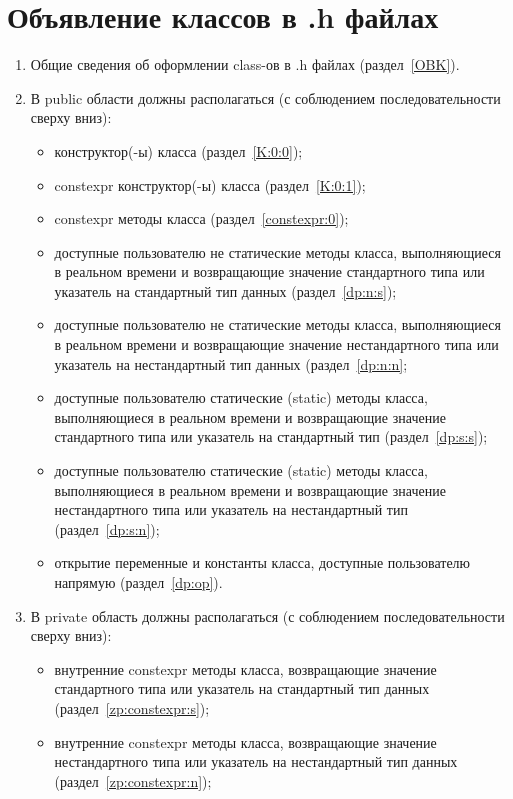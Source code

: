 \chapter{Объявление классов в .h файлах}\label{class:0}
\begin{enumerate}
	\item Общие сведения об оформлении class-ов в .h файлах (раздел~\ref{OBK}).
	\item В public области должны располагаться (с соблюдением последовательности сверху вниз):\begin{itemize}
		\item конструктор(-ы) класса (раздел~\ref{K:0:0});
		\item constexpr конструктор(-ы) класса (раздел~\ref{K:0:1});
		\item constexpr методы класса (раздел~\ref{constexpr:0});
		\item доступные пользователю не статические методы класса, выполняющиеся в реальном времени и возвращающие значение стандартного типа или указатель на стандартный тип данных (раздел~\ref{dp:n:s});
		\item доступные пользователю не статические методы класса, выполняющиеся в реальном времени и возвращающие значение нестандартного типа или указатель на нестандартный тип данных (раздел~\ref{dp:n:n};
		\item доступные пользователю статические (static) методы класса, выполняющиеся в реальном времени и возвращающие значение стандартного типа или указатель на стандартный тип (раздел~\ref{dp:s:s});
		\item доступные пользователю статические (static) методы класса, выполняющиеся в реальном времени и возвращающие значение нестандартного типа или указатель на нестандартный тип (раздел~\ref{dp:s:n});
		\item открытие переменные и константы класса, доступные пользователю напрямую (раздел~\ref{dp:op}).
	\end{itemize}
	\item В private область должны располагаться (с соблюдением последовательности сверху вниз):\begin{itemize}
		\item внутренние constexpr методы класса, возвращающие значение стандартного типа или указатель на стандартный тип данных (раздел~\ref{zp:constexpr:s});
		\item внутренние constexpr методы класса, возвращающие значение нестандартного типа или указатель на нестандартный тип данных (раздел~\ref{zp:constexpr:n});

\end{itemize}
\end{enumerate}
